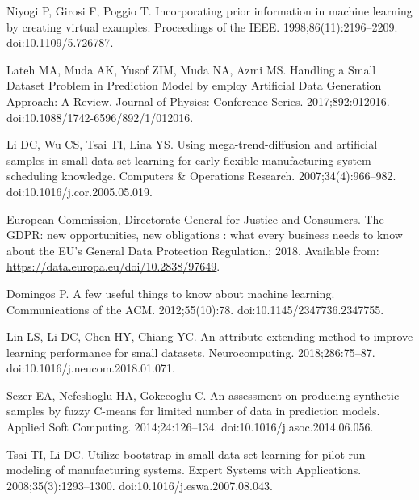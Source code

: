 \documentclass[10pt,letterpaper]{article}
\begin{document}
\nolinenumbers

\begin{thebibliography}{10}

  Niyogi P, Girosi F, Poggio T.
  \newblock Incorporating prior information in machine learning by creating
    virtual examples.
  \newblock Proceedings of the {IEEE}. 1998;86(11):2196--2209.
  \newblock doi:{10.1109/5.726787}.
  
  Lateh MA, Muda AK, Yusof ZIM, Muda NA, Azmi MS.
  \newblock Handling a Small Dataset Problem in Prediction Model by employ
    Artificial Data Generation Approach: A Review.
  \newblock Journal of Physics: Conference Series. 2017;892:012016.
  \newblock doi:{10.1088/1742-6596/892/1/012016}.
  
  Li DC, Wu CS, Tsai TI, Lina YS.
  \newblock Using mega-trend-diffusion and artificial samples in small data set
    learning for early flexible manufacturing system scheduling knowledge.
  \newblock Computers {\&} Operations Research. 2007;34(4):966--982.
  \newblock doi:{10.1016/j.cor.2005.05.019}.
  
  {European Commission}, {Directorate-General for Justice and Consumers}.
  \newblock The {GDPR}: new opportunities, new obligations : what every business
    needs to know about the {EU}’s {General} {Data} {Protection} {Regulation}.;
    2018.
  \newblock Available from: \url{https://data.europa.eu/doi/10.2838/97649}.
  
  Domingos P.
  \newblock A few useful things to know about machine learning.
  \newblock Communications of the {ACM}. 2012;55(10):78.
  \newblock doi:{10.1145/2347736.2347755}.
  
  Lin LS, Li DC, Chen HY, Chiang YC.
  \newblock An attribute extending method to improve learning performance for
    small datasets.
  \newblock Neurocomputing. 2018;286:75--87.
  \newblock doi:{10.1016/j.neucom.2018.01.071}.
  
  Sezer EA, Nefeslioglu HA, Gokceoglu C.
  \newblock An assessment on producing synthetic samples by fuzzy C-means for
    limited number of data in prediction models.
  \newblock Applied Soft Computing. 2014;24:126--134.
  \newblock doi:{10.1016/j.asoc.2014.06.056}.
  
  Tsai TI, Li DC.
  \newblock Utilize bootstrap in small data set learning for pilot run modeling
    of manufacturing systems.
  \newblock Expert Systems with Applications. 2008;35(3):1293--1300.
  \newblock doi:{10.1016/j.eswa.2007.08.043}.
  

\end{thebibliography}
\end{document}

